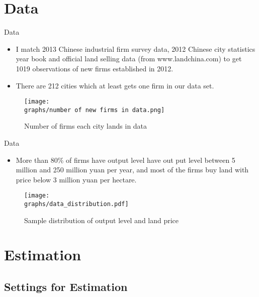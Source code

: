\documentclass[xcolor={dvipsnames}]{beamer}
\theoremstyle{plain}
\newcommand{\graphs}{../../Graphs}
\begin{document}
\section{Data}
\begin{frame}{Data}
    \begin{itemize}
        \item I match 2013 Chinese industrial firm survey data,
              2012 Chinese city statistics year book and official land selling data (from www.landchina.com)
              to get 1019 observations of new firms established in 2012.
        \item There are 212 cities which at least gets one firm in our data set.
    \end{itemize}
    \begin{figure}[H]
        \centering
        \caption*{Number of firms each city lands in data}
        \texttt{[image: \\graphs/number of new firms in data.png]}
        \label{firm_city_map}
    \end{figure}
\end{frame}

\begin{frame}{Data}
    \begin{itemize}
        \item More than 80\% of firms have output level have out put level between 5 million and 250 million
              yuan per year, and most of the firms buy land with price below 3 million yuan per hectare.
    \end{itemize}
    \begin{figure}[H]
        \centering
        \caption*{Sample distribution of output level and land price}
        \texttt{[image: \\graphs/data\_distribution.pdf]}
        \label{distribution of output and price}
    \end{figure}
\end{frame}


\section{Estimation}
\subsection{Settings for Estimation}
\end{document}
